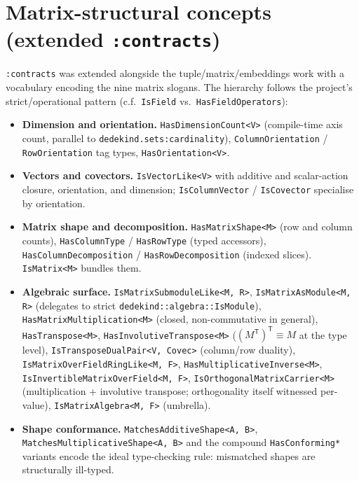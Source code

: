 \documentclass[11pt, a4paper]{report}
\begin{document}
\section{Matrix-structural concepts (extended \texttt{:contracts})}
\label{sec:linear_algebra-matrix-contracts}

\texttt{:contracts} was extended alongside the tuple/matrix/embeddings work with a vocabulary encoding the nine matrix slogans. The hierarchy follows the project's strict/operational pattern (c.f.\ \texttt{IsField} vs.\ \texttt{HasFieldOperators}):

\begin{itemize}
  \item \textbf{Dimension and orientation.} \texttt{HasDimensionCount<V>} (compile-time axis count, parallel to \texttt{dedekind.sets:cardinality}), \texttt{ColumnOrientation} / \texttt{RowOrientation} tag types, \texttt{HasOrientation<V>}.
  \item \textbf{Vectors and covectors.} \texttt{IsVectorLike<V>} with additive and scalar-action closure, orientation, and dimension; \texttt{IsColumnVector} / \texttt{IsCovector} specialise by orientation.
  \item \textbf{Matrix shape and decomposition.} \texttt{HasMatrixShape<M>} (row and column counts), \texttt{HasColumnType} / \texttt{HasRowType} (typed accessors), \texttt{HasColumnDecomposition} / \texttt{HasRowDecomposition} (indexed slices). \texttt{IsMatrix<M>} bundles them.
  \item \textbf{Algebraic surface.} \texttt{IsMatrixSubmoduleLike<M, R>}, \texttt{IsMatrixAsModule<M, R>} (delegates to strict \texttt{dedekind::algebra::IsModule}), \texttt{HasMatrixMultiplication<M>} (closed, non-commutative in general), \texttt{HasTranspose<M>}, \texttt{HasInvolutiveTranspose<M>} ($(M^{\mathsf{T}})^{\mathsf{T}} \equiv M$ at the type level), \texttt{IsTransposeDualPair<V, Covec>} (column/row duality), \texttt{IsMatrixOverFieldRingLike<M, F>}, \texttt{HasMultiplicativeInverse<M>}, \texttt{IsInvertibleMatrixOverField<M, F>}, \texttt{IsOrthogonalMatrixCarrier<M>} (multiplication + involutive transpose; orthogonality itself witnessed per-value), \texttt{IsMatrixAlgebra<M, F>} (umbrella).
  \item \textbf{Shape conformance.} \texttt{MatchesAdditiveShape<A, B>}, \texttt{MatchesMultiplicativeShape<A, B>} and the compound \texttt{HasConforming*} variants encode the ideal type-checking rule: mismatched shapes are structurally ill-typed.
\end{itemize}
\end{document}
